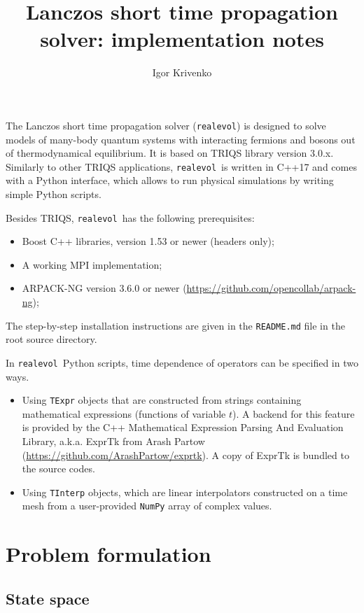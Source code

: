 \documentclass[]{article}
\title{Lanczos short time propagation solver: implementation notes}
\author{Igor Krivenko}
\newcommand{\realevol}{\texttt{realevol}}
\begin{document}
\maketitle

The Lanczos short time propagation solver (\realevol) is designed to solve models of many-body quantum systems with interacting fermions and bosons out of thermodynamical equilibrium. It is based on TRIQS library version 3.0.x. Similarly to other TRIQS applications, \realevol\ is written in C++17 and comes with a Python interface, which allows to run physical simulations by writing simple Python scripts.

Besides TRIQS, \realevol\ has the following prerequisites:
\begin{itemize}
    \item Boost C++ libraries, version 1.53 or newer (headers only);
    \item A working MPI implementation;
    \item ARPACK-NG version 3.6.0 or newer (\url{https://github.com/opencollab/arpack-ng});
\end{itemize}
The step-by-step installation instructions are given in the \texttt{README.md} file in the root source directory.

In \realevol\ Python scripts, time dependence of operators can be specified in 
two ways.
\begin{itemize}
    \item Using \texttt{TExpr} objects that are constructed from strings
    containing mathematical expressions (functions of variable $t$).
    A backend for this feature is provided by the C++ Mathematical Expression
    Parsing And Evaluation Library, a.k.a. ExprTk from Arash Partow
    (\url{https://github.com/ArashPartow/exprtk}). A copy of ExprTk is bundled
    to the source codes.

    \item Using \texttt{TInterp} objects, which are linear interpolators 
    constructed on a time mesh from a user-provided \texttt{NumPy} array of 
    complex values.
\end{itemize}

\section{\label{sec:formulation}Problem formulation}
\subsection{\label{sec:formulation:space}State space}
\end{document}
